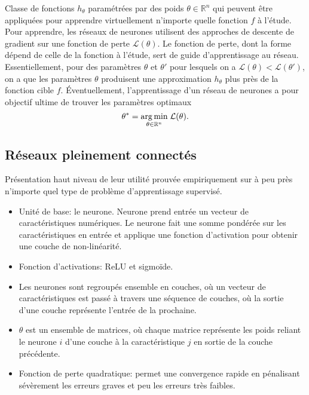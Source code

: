 Classe de fonctions $h_\theta$ paramétrées par des poids $\theta \in \mathbb{R}^n$ qui peuvent être appliquées pour apprendre
virtuellement n'importe quelle fonction $f$ à l'étude.
Pour apprendre, les réseaux de neurones utilisent des approches de
descente de gradient sur une fonction de perte $\mathcal{L}(\theta)$.
Le fonction de perte, dont la forme dépend de celle de la fonction
à l'étude, sert de guide d'apprentissage au réseau.
Essentiellement, pour des paramètres $\theta$ et $\theta'$
pour lesquels on a $\mathcal{L}(\theta) < \mathcal{L}(\theta')$, on a
que les paramètres $\theta$ produisent une approximation $h_\theta$
plus près de la fonction cible $f$.
Éventuellement, l'apprentissage d'un réseau de neurones a pour objectif
ultime de trouver les paramètres optimaux
\begin{equation*}
    \theta^* = \underset{\theta \in \mathbb{R}^n}{\operatorname*{arg\,min}} \; \mathcal{L}(\theta).
\end{equation*}

\subsection{Réseaux pleinement connectés}

Présentation haut niveau de leur utilité prouvée empiriquement
sur à peu près n'importe quel type de problème d'apprentissage
supervisé.

\begin{itemize}
    \item Unité de base: le neurone. Neurone prend entrée un vecteur de caractéristiques numériques.
          Le neurone fait une somme pondérée sur les caractéristiques en entrée et applique une
          fonction d'activation pour obtenir une couche de non-linéarité.
    \item Fonction d'activations: ReLU \citep{xu2015empirical} et sigmoïde.
    \item Les neurones sont regroupés ensemble en couches, où un vecteur de caractéristiques
          est passé à travers une séquence de couches, où la sortie d'une couche représente l'entrée
          de la prochaine.
    \item $\theta$ est un ensemble de matrices, où chaque matrice représente les poids
          reliant le neurone $i$ d'une couche à la caractéristique $j$ en sortie de la couche précédente.
    \item Fonction de perte quadratique: permet une convergence rapide en pénalisant sévèrement
          les erreurs graves et peu les erreurs très faibles.
\end{itemize}


